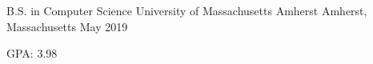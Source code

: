 \begin{cventries}
  \cventry
    {B.S. in Computer Science}
    {University of Massachusetts Amherst}
    {Amherst, Massachusetts}
    {May 2019}
    {
      \begin{cvitems}
        \item {GPA: 3.98}
      \end{cvitems}
    }
\end{cventries}

